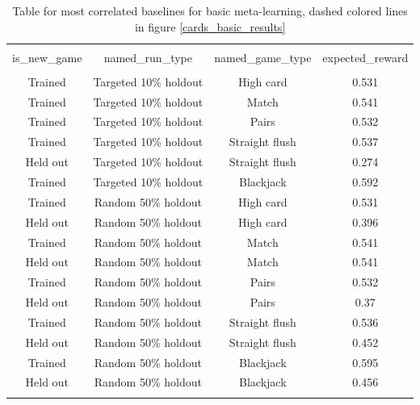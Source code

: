 \begin{table}[H]
\scriptsize
\centering
\begin{tabular}{@{\extracolsep{5pt}} cccc}
\\[-1.8ex]\hline
\hline \\[-1.8ex]
is\_new\_game & named\_run\_type & named\_game\_type & expected\_reward \\
\hline \\[-1.8ex]
Trained & Targeted 10\% holdout & High card & 0.531 \\
Trained & Targeted 10\% holdout & Match & 0.541 \\
Trained & Targeted 10\% holdout & Pairs & 0.532 \\
Trained & Targeted 10\% holdout & Straight flush & 0.537 \\
Held out & Targeted 10\% holdout & Straight flush & 0.274 \\
Trained & Targeted 10\% holdout & Blackjack & 0.592 \\
Trained & Random 50\% holdout & High card & 0.531 \\
Held out & Random 50\% holdout & High card & 0.396 \\
Trained & Random 50\% holdout & Match & 0.541 \\
Held out & Random 50\% holdout & Match & 0.541 \\
Trained & Random 50\% holdout & Pairs & 0.532 \\
Held out & Random 50\% holdout & Pairs & 0.37 \\
Trained & Random 50\% holdout & Straight flush & 0.536 \\
Held out & Random 50\% holdout & Straight flush & 0.452 \\
Trained & Random 50\% holdout & Blackjack & 0.595 \\
Held out & Random 50\% holdout & Blackjack & 0.456 \\
\hline \\[-1.8ex]
\end{tabular}
\caption{Table for most correlated baselines for basic meta-learning, dashed colored lines in figure \ref{cards_basic_results}}
\end{table}


